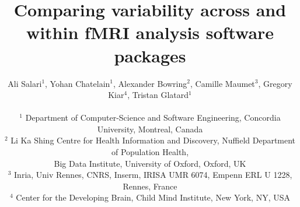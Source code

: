 \documentclass[11pt,onecolumn]{article}
\begin{document}
\newcommand{\fslspm}{FSL-SPM\xspace}
\newcommand{\fslafni}{FSL-AFNI\xspace}
\newcommand{\afnispm}{AFNI-SPM\xspace}
\newcommand{\tristan}[1]{\color{orange}\textbf{From Tristan:} #1\color{black}\xspace}
\newcommand{\camille}[1]{\color{blue}\textbf{From Camille:} #1\color{black}\xspace}
\newcommand{\ali}[2]{\color{green}\textbf{Ali:} #1\color{black}\xspace}
\newcommand{\discuss}[1]{\uwave{#1}}
\newcommand{\gk}[1]{\color{purple}#1 \textbf{-GK}\color{black}\xspace}
\newcommand{\yohan}[1]{\color{cyan!75!black} \textbf{Yohan:} #1\color{black}\xspace}
\newcommand{\yohanmod}[1]{\color{cyan!75!black} \sout{#1}\color{black}\xspace}


\title{Comparing variability across and within fMRI analysis software packages}

\author{Ali Salari$^1$, Yohan Chatelain$^1$, Alexander Bowring$^2$, Camille Maumet$^3$, Gregory Kiar$^4$, Tristan Glatard$^1$\\
  \vspace*{0.1cm}\\
  $^1$ Department of Computer-Science and Software Engineering, Concordia University, Montreal, Canada\\
  $^2$ Li Ka Shing Centre for Health Information and Discovery, Nuffield Department of Population Health,\\ Big Data Institute, University of Oxford, Oxford, UK\\
  $^3$ Inria, Univ Rennes, CNRS, Inserm, IRISA UMR 6074, Empenn ERL U 1228, Rennes, France\\
  $^4$ Center for the Developing Brain, Child Mind Institute, New York, NY, USA}
\end{document}
